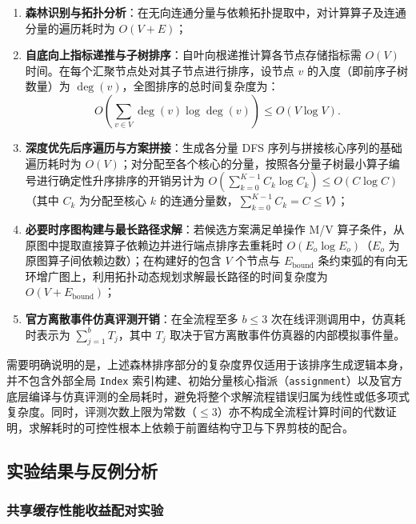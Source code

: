 \documentclass[anonymous,withtoc]{gmcm2026}
\providecommand{\tightlist}{\setlength{\itemsep}{0pt}\setlength{\parskip}{0pt}}
\begin{document}
\begin{enumerate}
\def\labelenumi{\arabic{enumi}.}
\tightlist
\item
  \textbf{森林识别与拓扑分析}：在无向连通分量与依赖拓扑提取中，对计算算子及连通分量的遍历耗时为 \(O(V + E)\)；
\item
  \textbf{自底向上指标递推与子树排序}：自叶向根递推计算各节点存储指标需 \(O(V)\) 时间。在每个汇聚节点处对其子节点进行排序，设节点 \(v\) 的入度（即前序子树数量）为 \(\deg(v)\)，全图排序的总时间复杂度为： \begin{equation}
O\left( \sum_{v \in V} \deg(v) \log \deg(v) \right) \le O(V \log V).
\end{equation}
\item
  \textbf{深度优先后序遍历与方案拼接}：生成各分量 DFS 序列与拼接核心序列的基础遍历耗时为 \(O(V)\)；对分配至各个核心的分量，按照各分量子树最小算子编号进行确定性升序排序的开销另计为 \(O\left(\sum_{k=0}^{K-1} C_k \log C_k\right) \le O(C \log C)\)（其中 \(C_k\) 为分配至核心 \(k\) 的连通分量数，\(\sum_{k=0}^{K-1} C_k = C \le V\)）；
\item
  \textbf{必要时序图构建与最长路径求解}：若候选方案满足单操作 M/V 算子条件，从原图中提取直接算子依赖边并进行端点排序去重耗时 \(O(E_o \log E_o)\)（\(E_o\) 为原图算子间依赖边数）；在构建好的包含 \(V\) 个节点与 \(E_{\mathrm{bound}}\) 条约束弧的有向无环增广图上，利用拓扑动态规划求解最长路径的时间复杂度为 \(O(V + E_{\mathrm{bound}})\)；
\item
  \textbf{官方离散事件仿真评测开销}：在全流程至多 \(b \le 3\) 次在线评测调用中，仿真耗时表示为 \(\sum_{j=1}^b T_j\)，其中 \(T_j\) 取决于官方离散事件仿真器的内部模拟事件量。
\end{enumerate}

需要明确说明的是，上述森林排序部分的复杂度界仅适用于该排序生成逻辑本身，并不包含外部全局 \texttt{Index} 索引构建、初始分量核心指派（\texttt{assignment}）以及官方底层编译与仿真评测的全局耗时，避免将整个求解流程错误归属为线性或低多项式复杂度。同时，评测次数上限为常数（\(\le 3\)）亦不构成全流程计算时间的代数证明，求解耗时的可控性根本上依赖于前置结构守卫与下界剪枝的配合。

\subsection{实验结果与反例分析}

\subsubsection{共享缓存性能收益配对实验}
\end{document}
